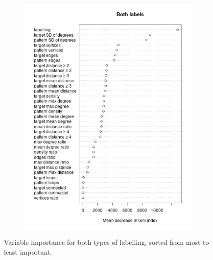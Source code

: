 \documentclass{l4proj}
\theoremstyle{definition}
\theoremstyle{remark}
\begin{document}
\begin{figure}
\begin{subfigure}[t]{0.49\textwidth}
    \includegraphics[width=\textwidth]{images/both_labels_variable_importance.png}
  \end{subfigure}
  \caption{Variable importance for both types of labelling, sorted from most to
    least important.}
  \label{fig:variable_importance}
\end{figure}
\end{document}
